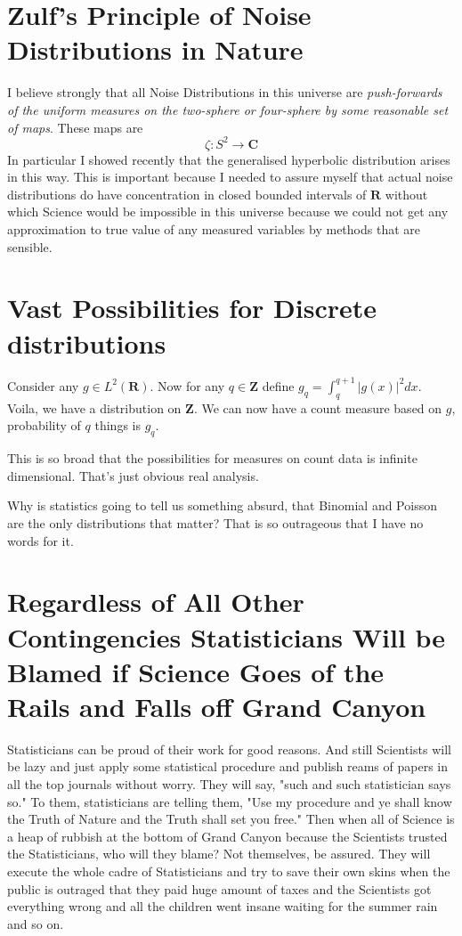\documentclass{amsart}
\begin{document}
\section{Zulf's Principle of Noise Distributions in Nature}

I believe strongly that all Noise Distributions in this universe are {\em push-forwards of the uniform measures on the two-sphere or four-sphere by some reasonable set of maps}.  These maps are
\[
\zeta: S^2 \rightarrow \mathbf{C}
\]
In particular I showed recently that the generalised hyperbolic distribution arises in this way.  This is important because I needed to assure myself that actual noise distributions do have concentration in closed bounded intervals of $\mathbf{R}$ without which Science would be impossible in this universe because we could not get any approximation to true value of any measured variables by methods that are sensible.

\section{Vast Possibilities for Discrete distributions}

Consider any $g \in L^2(\mathbf{R})$.  Now for any $q \in \mathbf{Z}$ define $g_q = \int_{q}^{q+1} |g(x)|^2 dx$.  Voila, we have a distribution on $\mathbf{Z}$.  We can now have a count measure based on $g$, probability of $q$ things is $g_q$.  

This is so broad that the possibilities for measures on count data is infinite dimensional.  That's just obvious real analysis.  

Why is statistics going to tell us something absurd, that Binomial and Poisson are the only distributions that matter?  That is so outrageous that I have no words for it.

\section{Regardless of All Other Contingencies Statisticians Will be Blamed if Science Goes of the Rails and Falls off Grand Canyon}

Statisticians can be proud of their work for good reasons.  And still Scientists will be lazy and just apply some statistical procedure and publish reams of papers in all the top journals without worry.  They will say, "such and such statistician says so."  To them, statisticians are telling them, "Use my procedure and ye shall know the Truth of Nature and the Truth shall set you free."  Then when all of Science is a heap of rubbish at the bottom of Grand Canyon because the Scientists trusted the Statisticians, who will they blame?  Not themselves, be assured.  They will execute the whole cadre of Statisticians and try to save their own skins when the public is outraged that they paid huge amount of taxes and the Scientists got everything wrong and all the children went insane waiting for the summer rain and so on.
\end{document}
